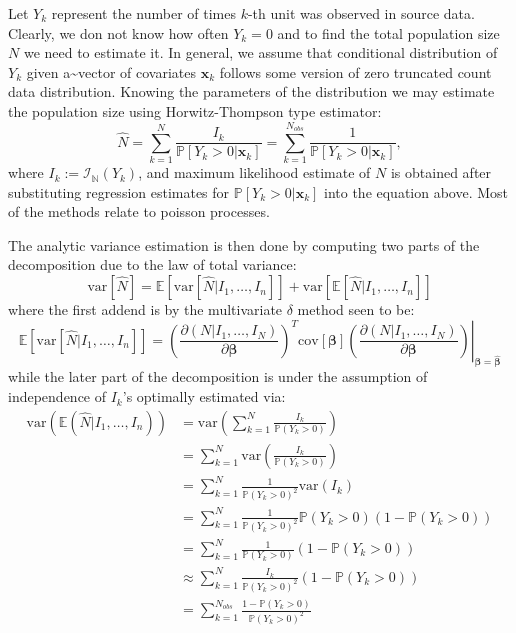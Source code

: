 \documentclass[
]{jss}
\newcommand{\1}{\mathcal{I}} \newcommand{\bx}{\boldsymbol{x}}
\begin{document}
Let \(Y_{k}\) represent the number of times \(k\)-th unit was observed
in source data. Clearly, we don not know how often \(Y_{k}=0\) and to
find the total population size \(N\) we need to estimate it. In general,
we assume that conditional distribution of \(Y_{k}\) given
a\textasciitilde vector of covariates \(\mathbf{x}_{k}\) follows some
version of zero truncated count data distribution. Knowing the
parameters of the distribution we may estimate the population size using
Horwitz-Thompson type estimator: \begin{equation*}
    \hat{N}=
    \sum_{k=1}^{N}\frac{I_{k}}{\mathbb{P}[Y_{k}>0|\mathbf{x}_{k}]}=
    \sum_{k=1}^{N_{obs}}\frac{1}{\mathbb{P}[Y_{k}>0|\mathbf{x}_{k}]},
\end{equation*} where \(I_{k}:=\mathcal{I}_{\mathbb{N}}(Y_{k})\), and
maximum likelihood estimate of \(N\) is obtained after substituting
regression estimates for \(\mathbb{P}[Y_{k}>0|\mathbf{x}_{k}]\) into the
equation above. Most of the methods relate to poisson processes.

The analytic variance estimation is then done by computing two parts of
the decomposition due to the law of total variance: \begin{equation*}
  \text{var}[\hat{N}]=
  \mathbb{E}\left[\text{var}
  \left[\hat{N}|I_{1},\dots,I_{n}\right]\right]+
  \text{var}\left[\mathbb{E}[\hat{N}|I_{1},\dots,I_{n}]\right]
\end{equation*} where the first addend is by the multivariate \(\delta\)
method seen to be: \begin{equation*}
  \mathbb{E}\left[\text{var}
  \left[\hat{N}|I_{1},\dots,I_{n}\right]\right]=
  \left.\left(\frac{\partial(N|I_1,\dots,I_N)}{\partial\boldsymbol{\beta}}\right)^{T}
  \text{cov}\left[\boldsymbol{\beta}\right]
  \left(\frac{\partial(N|I_1,\dots,I_N)}{\partial\boldsymbol{\beta}}\right)
  \right|_{\boldsymbol{\beta}=\hat{\boldsymbol{\beta}}}
\end{equation*} while the later part of the decomposition is under the
assumption of independence of \(I_{k}\)'s optimally estimated via:
\begin{align}
  \text{var}\left(\mathbb{E}(\hat{N}|I_{1},\dots,I_{n})\right)&=
  \text{var}\left(\sum_{k=1}^{N}\frac{I_{k}}{\mathbb{P}(Y_{k}>0)}\right)\nonumber\\
  &=\sum_{k=1}^{N}\text{var}\left(\frac{I_{k}}{\mathbb{P}(Y_{k}>0)}\right)\nonumber\\
  &=\sum_{k=1}^{N}\frac{1}{\mathbb{P}(Y_{k}>0)^{2}}\text{var}(I_{k})\nonumber\\
  &=\sum_{k=1}^{N}\frac{1}{\mathbb{P}(Y_{k}>0)^{2}}\mathbb{P}(Y_{k}>0)(1-\mathbb{P}(Y_{k}>0))\nonumber\\
  &=\sum_{k=1}^{N}\frac{1}{\mathbb{P}(Y_{k}>0)}(1-\mathbb{P}(Y_{k}>0))\nonumber\\
  &\approx\sum_{k=1}^{N}\frac{I_{k}}{\mathbb{P}(Y_{k}>0)^{2}}(1-\mathbb{P}(Y_{k}>0))\nonumber\\
  &=\sum_{k=1}^{N_{obs}}\frac{1-\mathbb{P}(Y_{k}>0)}{\mathbb{P}(Y_{k}>0)^{2}}
\end{align}
\end{document}
